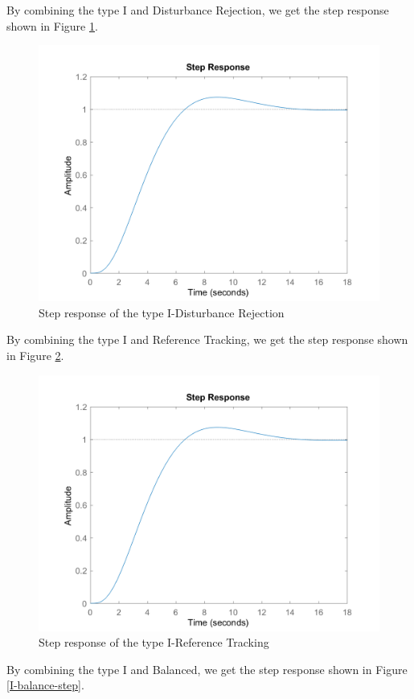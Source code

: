 \documentclass[a4paper, twocolumn, titlepage, 10pt]{article}
\begin{document}
   	By combining the type I and Disturbance Rejection, we get the step response shown in Figure \ref{I-rej-step}.
\begin{figure}[H]
	\centering
	\includegraphics[width=\linewidth]{I-rej-step}
	\caption{Step response of the type I-Disturbance Rejection}
	\label{I-rej-step} 
\end{figure}
   	By combining the type I and Reference Tracking, we get the step response shown in Figure \ref{I-track-step}.
\begin{figure}[H]
	\centering
	\includegraphics[width=\linewidth]{I-track-step}
	\caption{Step response of the type I-Reference Tracking}
	\label{I-track-step} 
\end{figure}
	   	By combining the type I and Balanced, we get the step response shown in Figure \ref{I-balance-step}.
\end{document}
